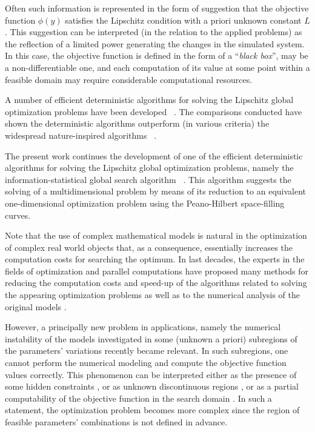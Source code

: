 \documentclass[runningheads]{llncs}
\begin{document}
Often such information is represented in the form of suggestion that the objective function $\phi(y)$ satisfies the Lipschitz condition with a priori unknown constant $L$.
This suggestion can be interpreted (in the relation to the applied problems) as the reflection of a limited power generating the changes in the simulated system. In this case, the objective function is defined in the form of a ``\textit{black box}'', may be a non-differentiable one, and each computation of its value at some point within a feasible domain may require considerable computational resources.

A number of efficient deterministic algorithms for solving the Lipschitz global optimization problems have been developed ~\cite{Grishagin2016_2,Jones2021,PaulaviciusZilinskas2014,Birect2020,Sergeyev2017}. The comparisons conducted have shown the deterministic algorithms outperform (in various criteria) the widespread nature-inspired algorithms ~\cite{Liberti2005,Sergeyev2018}.

The present work continues the development of one of the efficient deterministic algorithms for solving the Lipschitz global optimization problems, namely the information-statistical global search algorithm ~\cite{Sergeyev2013,Strongin2000}. This algorithm suggests the solving of a multidimensional problem by means of its reduction to an equivalent one-dimensional optimization problem using the Peano-Hilbert space-filling curves. 

Note that the use of complex mathematical models is natural in the optimization of complex real world objects that, as a consequence, essentially increases the computation costs for searching the optimum. In last decades, the experts in the fields of optimization and parallel computations have proposed many methods for reducing the computation costs and speed-up of the algorithms related to solving the appearing optimization problems \cite{Kvasov2013,Sergeyev2020} as well as to the numerical analysis of the original models \cite{Dongarra2022,Duwe2020}.

However, a principally new problem in applications, namely the numerical instability of the models investigated in some (unknown a priori) subregions of the parameters' variations recently became relevant. In such subregions, one cannot perform the numerical modeling and compute the objective function values correctly. This phenomenon can be interpreted either as the presence of some hidden constraints \cite{Stripinis2021}, or as unknown discontinuous regions \cite{Audet2022}, or as a partial computability of the objective function in the search domain \cite{Candelieri2019,Sergeyev2003,Strongin2020}. In such a statement, the optimization problem becomes more complex since the region of feasible parameters' combinations is not defined in advance.
\end{document}
